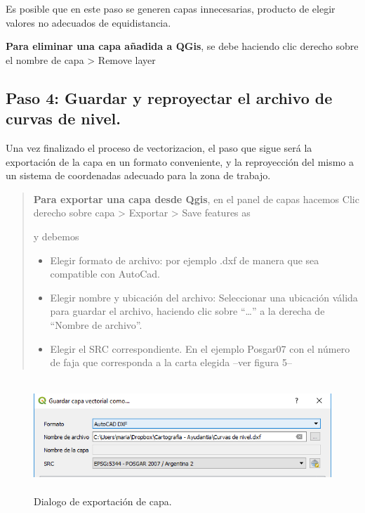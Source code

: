 \documentclass[12pt,]{extarticle}
\begin{document}
Es posible que en este paso se generen capas innecesarias, producto de
elegir valores no adecuados de equidistancia.

\textbf{Para eliminar una capa añadida a QGis}, se debe haciendo clic
derecho sobre el nombre de capa \textgreater{} Remove layer

\hypertarget{paso-4-guardar-y-reproyectar-el-archivo-de-curvas-de-nivel.}{%
\subsection{Paso 4: Guardar y reproyectar el archivo de curvas de
nivel.}\label{paso-4-guardar-y-reproyectar-el-archivo-de-curvas-de-nivel.}}

Una vez finalizado el proceso de vectorizacion, el paso que sigue será
la exportación de la capa en un formato conveniente, y la reproyección
del mismo a un sistema de coordenadas adecuado para la zona de trabajo.

\begin{quote}
\textbf{Para exportar una capa desde Qgis}, en el panel de capas hacemos
Clic derecho sobre capa \textgreater{} Exportar \textgreater{} Save
features as

y debemos

\begin{itemize}
\item
  Elegir formato de archivo: por ejemplo .dxf de manera que sea
  compatible con AutoCad.
\item
  Elegir nombre y ubicación del archivo: Seleccionar una ubicación
  válida para guardar el archivo, haciendo clic sobre ``\ldots{}'' a la
  derecha de ``Nombre de archivo''.
\item
  Elegir el SRC correspondiente. En el ejemplo Posgar07 con el número de
  faja que corresponda a la carta elegida --ver figura 5--
\end{itemize}
\end{quote}

\begin{figure}
\centering
\includegraphics[width=5.90556in,height=1.66319in]{../img/image5.png}
\caption{Dialogo de exportación de capa.}
\end{figure}
\end{document}
